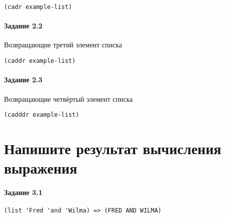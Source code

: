 \begin{lstlisting}
(cadr example-list)
\end{lstlisting}


\paragraph{Задание 2.2} Возвращающие третий элемент списка
\begin{lstlisting}
(caddr example-list)
\end{lstlisting}


\paragraph{Задание 2.3} Возвращающие четвёртый элемент списка
\begin{lstlisting}
(cadddr example-list)
\end{lstlisting}



\section{Напишите результат вычисления выражения}

\paragraph{Задание 3.1} \hfill

\begin{lstlisting}
(list 'Fred 'and 'Wilma) => (FRED AND WILMA)
\end{lstlisting}